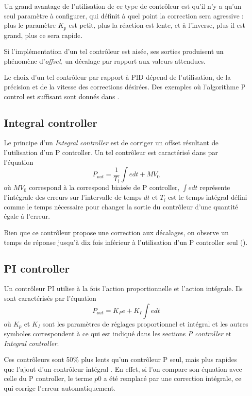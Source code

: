 \documentclass[a4paper,10pt]{report}
\begin{document}
Un grand avantage de l'utilisation de ce type de contrôleur est qu'il n'y a qu'un seul paramètre à configurer, qui définit à quel point la correction sera agressive : plus le paramètre $K_{p}$ est petit, plus la réaction est lente, et à l'inverse, plus il est grand, plus ce sera rapide.

Si l'implémentation d'un tel contrôleur est aisée, ses sorties produisent un phénomène d'\emph{offset}, un décalage par rapport aux valeurs attendues.

Le choix d'un tel contrôleur par rapport à PID dépend de l'utilisation, de la précision et de la vitesse des corrections désirées.
Des exemples où l'algorithme P control est suffisant sont donnés dans \cite{sellers2001overview}.

\subsection{Integral controller}
Le principe d'un \emph{Integral controller} est de corriger un offset résultant de l'utilisation d'un P controller.
Un tel contrôleur est caractérisé dans \cite{svrcek2006real} par l'équation
\begin{equation}P_{out} = \frac{1}{T_{i}}\int e dt + MV_{0}\end{equation}
où $MV_{0}$ correspond à la correspond biaisée de P controller,
$\int e dt$ représente l'intégrale des erreurs sur l'intervalle de temps $dt$ et $T_{i}$ est le temps intégral défini comme le temps nécessaire pour changer la sortie du contrôleur d'une quantité égale à l'erreur.

Bien que ce contrôleur propose une correction aux décalages, on observe un temps de réponse jusqu'à dix fois inférieur à l'utilisation d'un P controller seul (\cite{svrcek2006real}).

\subsection{PI controller}
Un contrôleur PI utilise à la fois l'action proportionnelle et l'action intégrale.
Ils sont caractérisés par l'équation
\begin{equation}P_{out} = K_{P} e + K_{I} \int e dt\end{equation}
où $K_{p}$ et $K_{I}$ sont les paramètres de réglages proportionnel et intégral
et les autres symboles correspondent à ce qui est indiqué dans les sections \emph{P controller} et \emph{Integral controller}.

Ces contrôleurs sont 50\% plus lents qu'un contrôleur P seul, mais plus rapides que l'ajout d'un contrôleur intégral \cite{svrcek2006real}.
En effet, si l'on compare son équation avec celle du P controller, le terme $p0$ a été remplacé par une correction intégrale, ce qui corrige l'erreur automatiquement.
\end{document}
